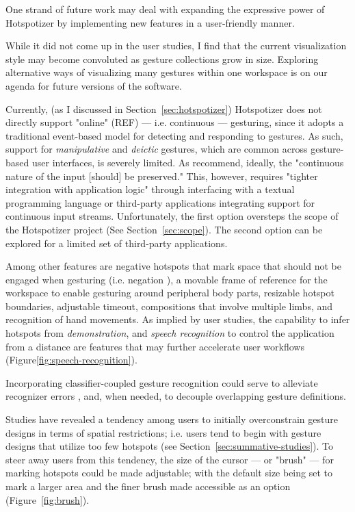 One strand of future work may deal with expanding the expressive power of Hotspotizer by implementing new features in a user-friendly manner.

While it did not come up in the user studies, I find that the current visualization style may become convoluted as gesture collections grow in size. Exploring alternative ways of visualizing many gestures within one workspace is on our agenda for future versions of the software.

Currently, (as I discussed in Section~\ref{sec:hotspotizer}) Hotspotizer does not directly support "online" (REF) --- i.e. continuous --- gesturing, since it adopts a traditional event-based model for detecting and responding to gestures. As such, support for \emph{manipulative} and \emph{deictic} gestures, which are common across gesture-based user interfaces, is severely limited. As \textcite{Myers:2000} recommend, ideally, the "continuous nature of the input [should] be preserved." This, however, requires "tighter integration with application logic" \parencite{Hartmann:2007} through interfacing with a textual programming language or third-party applications integrating support for continuous input streams. Unfortunately,  the first option oversteps the scope of the Hotspotizer project (See Section~\ref{sec:scope}). The second option can be explored for a limited set of third-party applications.

Among other features are negative hotspots that mark space that should not be engaged when gesturing (i.e. negation \parencite{Hoste:2014}), a movable frame of reference for the workspace to enable gesturing around peripheral body parts, resizable hotspot boundaries, adjustable timeout, compositions that involve multiple limbs, and recognition of hand movements.  As implied by user studies, the capability to infer hotspots from \emph{demonstration}, and \emph{speech recognition} to control the application from a distance are features that may further accelerate user workflows (Figure\ref{fig:speech-recognition}).

Incorporating classifier-coupled gesture recognition \parencite{Hoste:2013} could serve to alleviate recognizer errors \parencite{Myers:2000}, and, when needed, to decouple overlapping gesture definitions.

Studies have revealed a tendency among users to initially overconstrain gesture designs in terms of spatial restrictions; i.e. users tend to begin with gesture designs that utilize too few hotspots (see Section~\ref{sec:summative-studies}). To steer away users from this tendency, the size of the cursor --- or "brush" --- for marking hotspots could be made adjustable; with the default size being set to mark a larger area and the finer brush made accessible as an option (Figure~\ref{fig:brush}).

